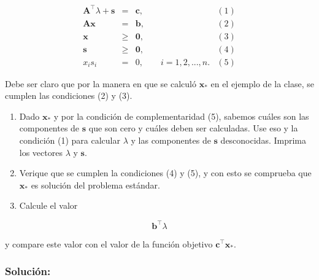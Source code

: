 \documentclass[11pt]{article}
\providecommand{\tightlist}{%
      \setlength{\itemsep}{0pt}\setlength{\parskip}{0pt}}
\begin{document}
\[
\begin{array}{rclc}
  \mathbf{A}^\top \lambda + \mathbf{s} &=& \mathbf{c}, & (1) \\
  \mathbf{A}\mathbf{x} &=& \mathbf{b}, & (2) \\
  \mathbf{x} & \geq & \mathbf{0}, & (3)  \\
  \mathbf{s} & \geq & \mathbf{0}, & (4)  \\
  x_i s_i &=& 0, \qquad i=1,2,...,n. & (5)
\end{array}
\]

Debe ser claro que por la manera en que se calculó \(\mathbf{x}_*\) en
el ejemplo de la clase, se cumplen las condiciones (2) y (3).

\begin{enumerate}
\def\labelenumi{\arabic{enumi}.}
\tightlist
\item
  Dado \(\mathbf{x}_*\) y por la condición de complementaridad (5),
  sabemos cuáles son las componentes de \(\mathbf{s}\) que son cero y
  cuáles deben ser calculadas. Use eso y la condición (1) para calcular
  \(\lambda\) y las componentes de \(\mathbf{s}\) desconocidas.
  Imprima los vectores \(\lambda\) y \(\mathbf{s}\).
\item
  Verique que se cumplen la condiciones (4) y (5), y con esto se
  comprueba que \(\mathbf{x}_*\) es solución del problema estándar.
\item
  Calcule el valor
\end{enumerate}

\[\mathbf{b}^\top \lambda \]

y compare este valor con el valor de la función objetivo
\(\mathbf{c}^\top \mathbf{x}_*\).

\hypertarget{soluciuxf3n}{%
\subsubsection{Solución:}\label{soluciuxf3n}}
\end{document}
